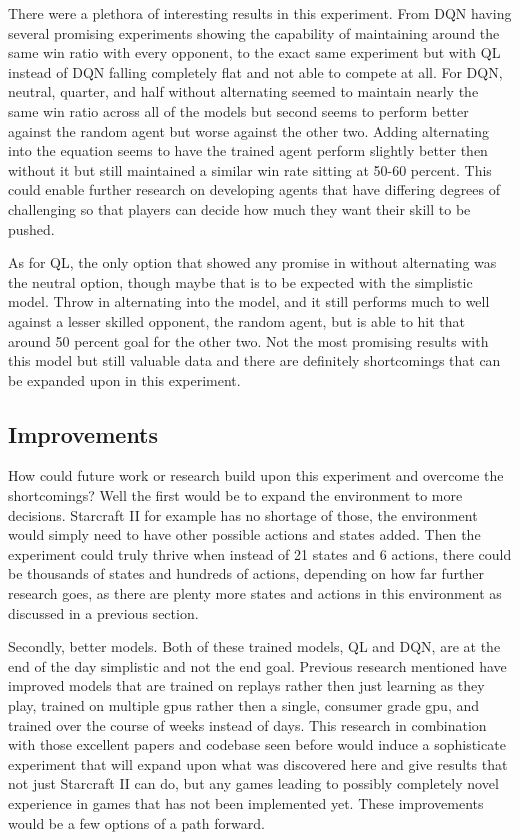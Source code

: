 There were a plethora of interesting results in this experiment. From DQN having several promising experiments showing the capability of maintaining around the same win ratio with every opponent, to the exact same experiment but with QL instead of DQN falling
completely flat and not able to compete at all. For DQN, neutral, quarter, and half without alternating seemed to maintain nearly the same win ratio across all of the models but second seems to perform better against the random agent but worse against the 
other two. Adding alternating into the equation seems to have the trained agent perform slightly better then without it but still maintained a similar win rate sitting at 50-60 percent. This could enable further research on developing agents that have 
differing degrees of challenging so that players can decide how much they want their skill to be pushed.

As for QL, the only option that showed any promise in without alternating was the neutral option, though maybe that is to be expected with the simplistic model. Throw in alternating into the model, and it still performs much to well against a lesser skilled 
opponent, the random agent, but is able to hit that around 50 percent goal for the other two. Not the most promising results with this model but still valuable data and there are definitely shortcomings that can be expanded upon in this experiment. 

  \subsection{Improvements}

How could future work or research build upon this experiment and overcome the shortcomings? Well the first would be to expand the environment to more decisions. Starcraft II for example has no shortage of those, the environment would simply need to have 
other possible actions and states added. Then the experiment could truly thrive when instead of 21 states and 6 actions, there could be thousands of states and hundreds of actions, depending on how far further research goes, as there are plenty more 
states and actions in this environment as discussed in a previous section. 

Secondly, better models. Both of these trained models, QL and DQN, are at the end of the day simplistic and not the end goal. Previous research mentioned have improved models that are trained on replays rather then just learning as they play, trained on 
multiple gpus rather then a single, consumer grade gpu, and trained over the course of weeks instead of days. This research in combination with those excellent papers and codebase seen before would induce a sophisticate experiment that will expand upon 
what was discovered here and give results that not just Starcraft II can do, but any games leading to possibly completely novel experience in games that has not been implemented yet. These improvements would be a few options of a path forward.